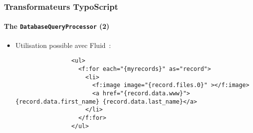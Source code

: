 \begin{frame}[fragile]
	\frametitle{Transformateurs TypoScript}
	\framesubtitle{The \texttt{DatabaseQueryProcessor} (2)}

	\lstset{basicstyle=\tiny\ttfamily}

	\begin{itemize}

		\item Utilisation possible avec Fluid~:

			\begin{lstlisting}
				<ul>
				  <f:for each="{myrecords}" as="record">
				    <li>
				      <f:image image="{record.files.0}" ></f:image>
				      <a href="{record.data.www}">{record.data.first_name} {record.data.last_name}</a>
				    </li>
				  </f:for>
				</ul>
			\end{lstlisting}

	\end{itemize}

\end{frame}

